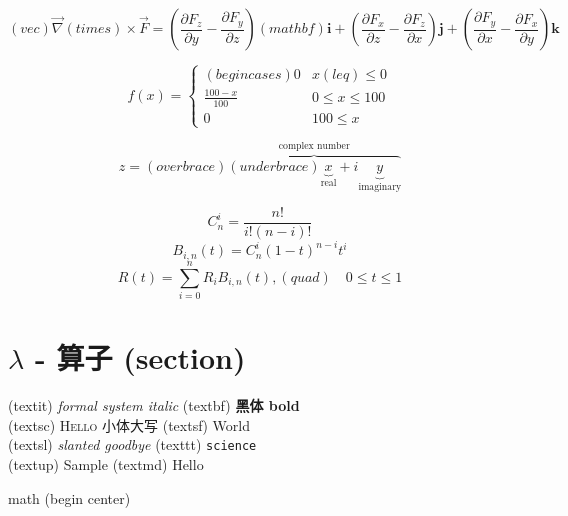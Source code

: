 \documentclass[11pt]{article}
\begin{document}
\begin{equation}
(vec)\vec{\nabla} (times)\times \vec{F} = \left( \frac{\partial F_z}{\partial y} - \frac{\partial F_y}{\partial z} \right) (mathbf)\mathbf{i}
        + \left( \frac{\partial F_x}{\partial z} - \frac{\partial F_z}{\partial x} \right) \mathbf{j} + \left( \frac{\partial
        F_y}{\partial x} - \frac{\partial F_x}{\partial y} \right) \mathbf{k}
\end{equation}

\begin{equation}
f(x) = \begin{cases} (begin cases)
	0 & x(leq)\leq 0 \\
	\frac{100-x}{100} & 0\leq x\leq 100 \\
	0 & 100\leq x 
\end{cases}
\end{equation}

\begin{equation}
z = (overbrace)\overbrace{
	(underbrace)\underbrace{x}_\text{real} + i
	\underbrace{y}_\text{imaginary}
}^\text{complex number}
\end{equation}

\begin{equation}
C_n^i=\frac{n!}{i!(n-i)!}
\end{equation}
\begin{equation}
B_{i,n}(t)=C_n^i(1-t)^{n-i}t^i
\end{equation}
\begin{equation}
R(t)=\sum_{i=0}^n R_iB_{i,n}(t),(quad)\quad 0\leq t\leq 1
\end{equation}

\setmainfont{WenQuanYi Zen Hei}

\section{$\lambda$ - 算子 (section)}

(textit) \textit{formal system italic} \quad (textbf) \textbf{黑体 bold} \\
(textsc) \textsc{Hello 小体大写} \quad (textsf) \textsf{World } \\
\quad (textsl) \textsl{slanted goodbye} \quad (texttt) \texttt{science} \\
(textup) \textup{Sample} \quad (textmd) \textmd{Hello}

\begin{center}
math (begin center)
\end{center}
\end{document}
